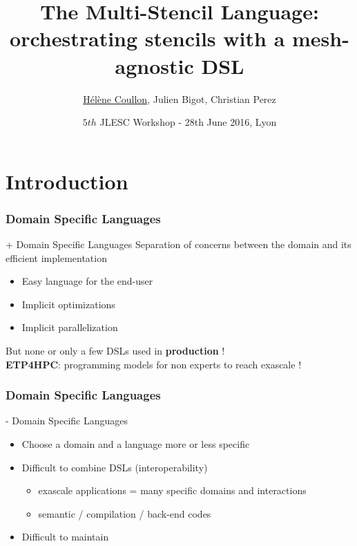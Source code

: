 \documentclass{beamer}
\title[The Multi-Stencil Language]{The Multi-Stencil Language: orchestrating stencils with a mesh-agnostic DSL}
\author[Hélène Coullon (INRIA), Julien Bigot (CEA), Christian Perez (INRIA)]{\underline{Hélène Coullon}, Julien Bigot, Christian Perez}
\institute[INRIA]{INRIA team Avalon\\Maison de la simulation (CEA)}
\date{$5{th}$ JLESC Workshop - 28th June 2016, Lyon}
\begin{document}

\begin{frame}
    \titlepage
\end{frame}

\section{Introduction}
\begin{frame}
\frametitle{Domain Specific Languages} %
\begin{block}{+ Domain Specific Languages}
Separation of concerns between the domain and its efficient implementation
\begin{itemize}
\item Easy language for the end-user
\item Implicit optimizations
\item Implicit parallelization
\end{itemize}
\end{block}
But none or only a few DSLs used in \textbf{production} !\\
\textbf{ETP4HPC}: programming models for non experts to reach exascale !
\end{frame}
\begin{frame}
\frametitle{Domain Specific Languages} %
\begin{alertblock}{- Domain Specific Languages}
\begin{itemize}
\item Choose a domain and a language more or less specific
\item Difficult to combine DSLs (interoperability)
\begin{itemize}
\item exascale applications = many specific domains and interactions
\item semantic / compilation / back-end codes
\end{itemize}
\item Difficult to maintain
\end{itemize}
\end{alertblock}
\end{frame}
\end{document}
